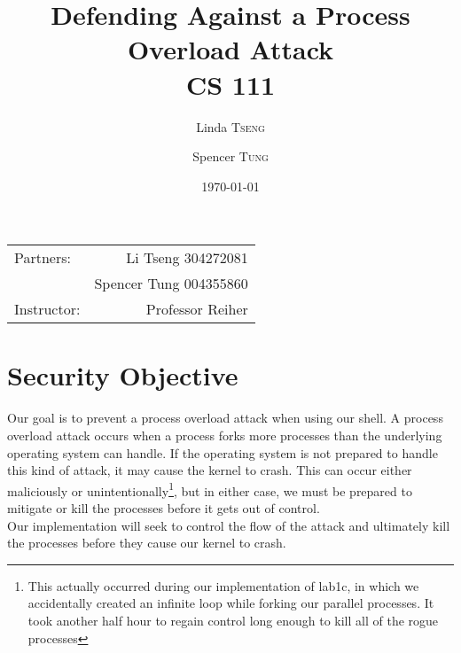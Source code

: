 \documentclass{article}
\title{Defending Against a Process Overload Attack \\ CS 111} %
\author{Linda \textsc{Tseng}
		\and
		Spencer \textsc{Tung}} %
\date{\today} %
\begin{document}
\maketitle %

\begin{center}
\begin{tabular}{l r} 
Partners: & Li Tseng 304272081 \\ %
& Spencer Tung 004355860 \\
Instructor: & Professor Reiher %
\end{tabular}
\end{center}



\section{Security Objective}

Our goal is to prevent a process overload attack when using our shell. A 
process overload attack occurs when a process forks more processes than the
underlying operating system can handle. If the operating system is not prepared
to handle this kind of attack, it may cause the kernel to crash. This can 
occur either maliciously or unintentionally\footnote{This actually occurred
during our implementation of lab1c, in which we accidentally created an 
infinite loop while forking our parallel processes. It took another half hour
to regain control long enough to kill all of the rogue processes}, but in 
either case, we must be prepared to mitigate or kill the processes before it 
gets out of control. \\ 

Our implementation will seek to control the flow of the attack and ultimately
kill the processes before they cause our kernel to crash.


\end{document}
